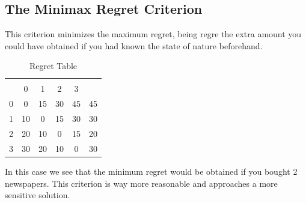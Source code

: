 \documentclass{report}
\begin{document}
        \subsection{The Minimax Regret Criterion}
            This criterion minimizes the maximum regret, being regre the extra amount you could have obtained if you had known the state of nature beforehand.
           \begin{table}[h]
                \centering
                \begin{tabular}{cccccc}
                    \rowcolor[HTML]{00009B} 
                    \cellcolor[HTML]{00009B}{\color[HTML]{FFFFFF} } &
                    \multicolumn{4}{c}{\cellcolor[HTML]{00009B}{\color[HTML]{FFFFFF} State of Nature}} &
                    \cellcolor[HTML]{00009B}{\color[HTML]{FFFFFF} Maximum} \\
                    \rowcolor[HTML]{CBCEFB} 
                    \multirow{-2}{*}{\cellcolor[HTML]{00009B}{\color[HTML]{FFFFFF} Decision}} &
                    0 &
                    1 &
                    2 &
                    3 &
                    \cellcolor[HTML]{00009B}{\color[HTML]{FFFFFF} Regret} \\
                    \cellcolor[HTML]{CBCEFB}0 & 0  & 15 & 30 & 45 & 45 \\
                    \rowcolor[HTML]{EFEFEF} 
                    \cellcolor[HTML]{CBCEFB}1 & 10 & 0  & 15 & 30 & 30 \\
                    \cellcolor[HTML]{CBCEFB}2 & 20 & 10 & 0  & 15 & 20 \\
                    \rowcolor[HTML]{EFEFEF} 
                    \cellcolor[HTML]{CBCEFB}3 & 30 & 20 & 10 & 0  & 30
                \end{tabular}
                \caption{Regret Table}
                \label{tab:regret_table}
            \end{table}
            In this case we see that the minimum regret would be obtained if you bought 2 newspapers. This criterion is way more reasonable and approaches a more sensitive solution.
\end{document}
